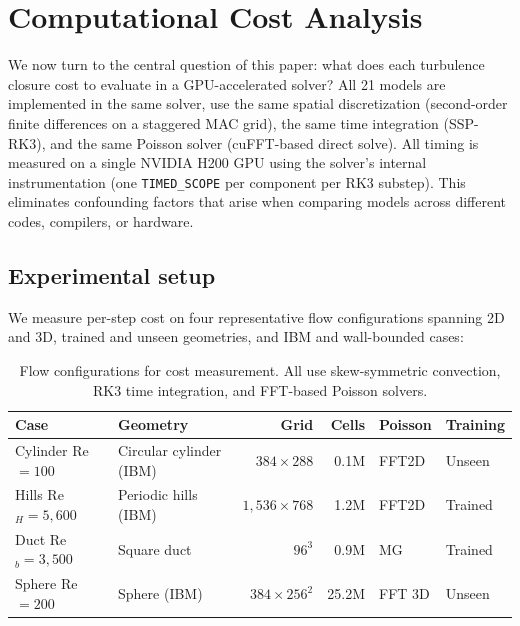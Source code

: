 \section{Computational Cost Analysis}
\label{sec:cost}

We now turn to the central question of this paper: what does each turbulence closure cost to evaluate in a GPU-accelerated solver?
All 21 models are implemented in the same solver, use the same spatial discretization (second-order finite differences on a staggered MAC grid), the same time integration (SSP-RK3), and the same Poisson solver (cuFFT-based direct solve).
All timing is measured on a single NVIDIA H200 GPU using the solver's internal instrumentation (one \texttt{TIMED\_SCOPE} per component per RK3 substep).
This eliminates confounding factors that arise when comparing models across different codes, compilers, or hardware.

\subsection{Experimental setup}
\label{sec:cost:setup}

We measure per-step cost on four representative flow configurations spanning 2D and 3D, trained and unseen geometries, and IBM and wall-bounded cases:

\begin{table}[htbp]
\centering
\caption{Flow configurations for cost measurement. All use skew-symmetric convection, RK3 time integration, and FFT-based Poisson solvers.}
\label{tab:cost_cases}
\begin{tabular}{llrrll}
\toprule
Case & Geometry & Grid & Cells & Poisson & Training \\
\midrule
Cylinder Re$=100$ & Circular cylinder (IBM) & $384 \times 288$ & 0.1M & FFT2D & Unseen \\
Hills Re$_H=5{,}600$ & Periodic hills (IBM) & $1{,}536 \times 768$ & 1.2M & FFT2D & Trained \\
Duct Re$_b=3{,}500$ & Square duct & $96^3$ & 0.9M & MG & Trained \\
Sphere Re$=200$ & Sphere (IBM) & $384 \times 256^2$ & 25.2M & FFT 3D & Unseen \\
\bottomrule
\end{tabular}
\end{table}

